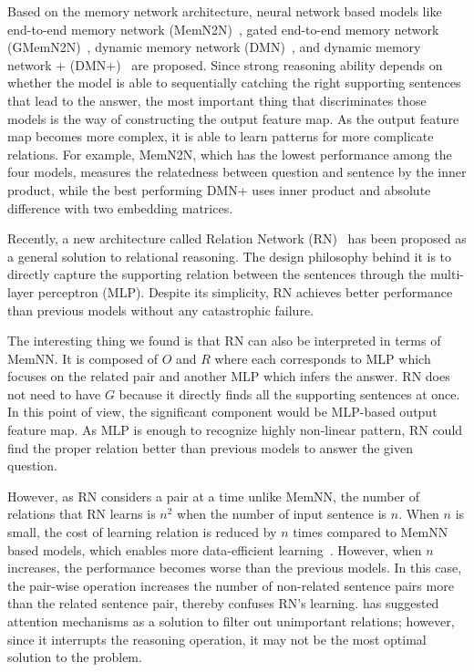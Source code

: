 \documentclass{article} \usepackage{iclr2018_conference,times}
\begin{document}
Based on the memory network architecture, neural network based models like end-to-end memory network (MemN2N)~\citep{sukhbaatar2015end}, gated end-to-end memory network (GMemN2N)~\citep{liu2017gated}, dynamic memory network (DMN)~\citep{kumar2016ask}, and dynamic memory network + (DMN+)~\citep{xiong2016dynamic} are proposed.
Since strong reasoning ability depends on whether the model is able to sequentially catching the right supporting sentences that lead to the answer, the most important thing that discriminates those models is the way of constructing the output feature map. As the output feature map becomes more complex, it is able to learn patterns for more complicate relations.
For example, MemN2N, which has the lowest performance among the four models, measures the relatedness between question and sentence by the inner product, while the best performing DMN+ uses inner product and absolute difference with two embedding matrices.



Recently, a new architecture called Relation Network (RN)~\citep{santoro2017simple} has been proposed as a general  solution to relational reasoning. 
The design philosophy behind it is to directly capture the supporting relation between the sentences through the multi-layer perceptron (MLP).
Despite its simplicity, RN achieves better performance than previous models without any catastrophic failure. 

The interesting thing we found is that RN can also be interpreted in terms of MemNN. 
It is composed of $O$ and $R$ where each corresponds to MLP which focuses on the related pair and another MLP which infers the answer.
RN does not need to have $G$ because it directly finds all the supporting sentences at once.
In this point of view, the significant component would be MLP-based output feature map.
As MLP is enough to recognize highly non-linear pattern, RN could find the proper relation better than previous models to answer the given question.

However, as RN considers a pair at a time unlike MemNN, the number of relations that RN learns is $n^2$ when the number of input sentence is $n$.
When $n$ is small, the cost of learning relation is reduced by $n$ times compared to MemNN based models, which enables more data-efficient learning~\citep{santoro2017simple}.
However, when $n$ increases, the performance becomes worse than the previous models.
In this case, the pair-wise operation increases the number of non-related sentence pairs more than the related sentence pair, thereby confuses RN's learning.
\citet{santoro2017simple} has suggested attention mechanisms as a solution to filter out unimportant relations; however, since it interrupts the reasoning operation, it may not be the most optimal solution to the problem.
\end{document}
